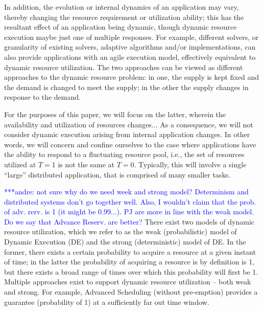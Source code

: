 \documentclass[conference,final]{IEEEtran}
\newcommand{\jhanote}[1]{ {\textcolor{red} { ***shantenu: #1 }}}
\newcommand{\alnote}[1]{ {\textcolor{blue} { ***andre: #1 }}}
\newcommand{\alnote}[1]{}
\newcommand{\jhanote}[1]{}
\begin{document}

In addition, the evolution or internal dynamics of an application may
vary, thereby changing the resource requirement or utilization
ability; this has the resultant effect of an application being
dynamic, though dynamic resource execution maybe just one of multiple
responses.  For example, different solvers, or granularity of existing
solvers, adaptive algorithms and/or implementations, can also provide
applications with an agile execution model, effectively equivalent to
dynamic resource utilization. The two approaches can be viewed as
different approaches to the dynamic resource problem: in one, the
supply is kept fixed and the demand is changed to meet the supply; in
the other the supply changes in response to the demand.

For the purposes of this paper, we will focus on the latter, wherein
the availability and utilization of resources changes...  As a
consequence, we will not consider dynamic execution arising from
internal application changes.  In other words, we will concern
and confine ourselves to  %
the case where applications have the ability to respond to a
fluctuating resource pool, i.e., the set of resources utilized at
$T=$1 is not the same at $T=$0.  Typically, this will involve a
single ``large'' distributed application, that is comprised of many
smaller tasks.



\alnote{not sure why do we need week and strong model? Determinism and 
distributed systems don't go together well. Also, I wouldn't claim that
the prob. of adv. rerv. is 1 (it might be 0.99...). PJ are more in line
with the weak model. Do we say that Advance Reserv. are better?}
There exist two models of dynamic resource utilization, which we refer
to as the weak (probabilistic) model of Dynamic Execution (DE) and the
strong (deterministic) model of DE. In the former, there exists a
certain probability to acquire a resource at a given instant of time;
in the latter the probability of acquiring a resource is by definition
is 1, but there exists a broad range of times over which this
probability will first be 1.  Multiple approaches exist to support
dynamic resource utilization -- both weak and strong.  For example,
Advanced Scheduling (without pre-emption) provides a guarantee
(probability of 1) at a sufficiently far out time window.
\end{document}
